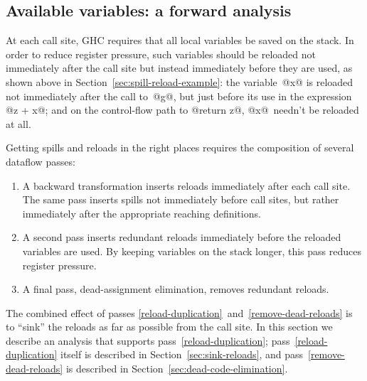 \documentclass[blockstyle,preprint,nocopyrightspace]{sigplanconf}
\newcommand\secref[1]{Section~\ref{sec:#1}}
\begin{document}
% 
% 
% 
% 

\subsection{Available variables: a forward analysis} \label{s:fwd-client}

At each call site, GHC requires that all local variables be saved on
the stack.
In order to reduce register pressure,
such variables should be reloaded not immediately after the call site
but instead immediately before they are used, as shown above in
\secref{spill-reload-example}: the variable~@x@ is reloaded not
immediately after the call to~@g@, but just before its use in the
expression @z + x@;
and on the control-flow path to @return z@, @x@~needn't be reloaded
at all.

Getting spills and reloads in the right places requires the
composition of several dataflow passes:
\begin{enumerate}
\item
A backward transformation inserts reloads immediately after each call
site.
The same pass inserts spills not immediately before call sites, but
rather immediately after the appropriate reaching definitions.
\item
\label{reload-duplication}
A second pass inserts redundant reloads immediately before the
reloaded variables are used.
By keeping variables on the stack longer, this pass reduces register
pressure.
\item
\label{remove-dead-reloads}
A final pass, dead-assignment elimination, removes redundant reloads.
\end{enumerate}
The combined effect of passes
\ref{reload-duplication}~and~\ref{remove-dead-reloads} is to ``sink''
the reloads as far as possible from the call site.
In this section we describe an analysis that supports
pass~\ref{reload-duplication}; 
pass~\ref{reload-duplication} itself is described in
\secref{sink-reloads}, and 
pass~\ref{remove-dead-reloads} is described in
\secref{dead-code-elimination}.
\end{document}
